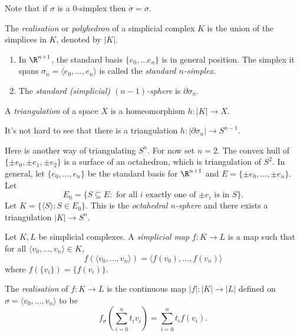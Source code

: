 \documentclass[a4paper]{article}
\renewcommand{\b}{\partial} %
\newcommand{\interior}{\mathring} %
\begin{document}
Note that if \(\sigma\) is a \(0\)-simplex then \(\interior \sigma = \sigma\).

\begin{definition}
  The \emph{realisation} or \emph{polyhedron} of a simplicial complex \(K\) is the union of the simplices in \(K\), denoted by \(|K|\).
\end{definition}

\begin{eg}\leavevmode
  \begin{enumerate}
  \item In \(\R^{n + 1}\), the standard basis \(\{e_0, \dots e_n\}\) is in general position. The simplex it spans \(\sigma_n = \langle e_0, \dots, e_n\rangle\) is called the \emph{standard \(n\)-simplex}.
  \item The \emph{standard (simplicial) \((n - 1)\)-sphere} is \(\b \sigma_n\). 
  \end{enumerate}
\end{eg}

\begin{definition}[triangulation]
  A \emph{triangulation} of a space \(X\) is a homeomorphism \(h: |K| \to X\).
\end{definition}

It's not hard to see that there is a triangulation \(h: |\b \sigma_n| \to S^{n - 1}\).

\begin{eg}
  Here is another way of triangulating \(S^n\). For now set \(n = 2\). The convex hull of \(\{\pm e_0, \pm e_1, \pm e_2\}\) is a surface of an octahedron, which is triangulation of \(S^2\). In general, let \(\{e_0, \dots, e_n\}\) be the standard basis for \(\R^{n + 1}\) and \(E = \{\pm e_0, \dots, \pm e_n\}\). Let
  \[
    E_0 = \{S \subseteq E: \text{ for all \(i\) exactly one of \(\pm e_i\) is in } S\}.
  \]
  Let \(K = \{\langle S \rangle: S \in E_0\}\). This is the \emph{octahedral \(n\)-sphere} and there exists a triangulation \(|K| \to S^n\).
\end{eg}

\begin{definition}
  Let \(K, L\) be simplicial complexes. A \emph{simplicial map} \(f: K \to L\) is a map such that for all \(\langle v_0, \dots, v_n \rangle \in K\),
  \[
    f(\langle v_0, \dots, v_n \rangle) = \langle f(v_0), \dots, f(v_n) \rangle
  \]
  where \(f(\{v_i\}) = \{f(v_i)\}\).

  The \emph{realisation} of \(f: K \to L\) is the continuous map \(|f|: |K| \to |L|\) defined on \(\sigma = \langle v_0 , \dots, v_n \rangle\) to be
  \[
    f_\sigma \left( \sum_{i = 0}^n t_iv_i \right) = \sum_{i = 0}^n t_i f(v_i).
  \]
\end{definition}
\end{document}
